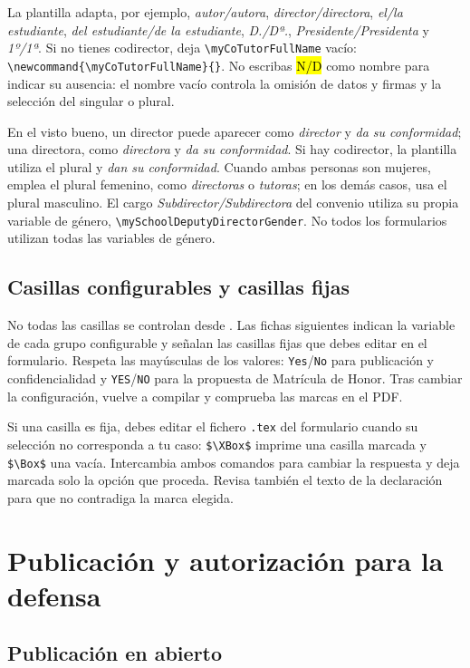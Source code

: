\documentclass[10pt,a4paper]{article}
\newcommand{\variable}[1]{\texttt{\textbackslash{}}\nolinkurl{#1}}
\newcommand{\fichero}[1]{\path{#1}}
\begin{document}
La plantilla adapta, por ejemplo, \emph{autor/autora}, \emph{director/directora}, \emph{el/la estudiante}, \emph{del estudiante/de la estudiante}, \emph{D./Dª.}, \emph{Presidente/Presidenta} y \emph{1º/1ª}. Si no tienes codirector, deja \variable{myCoTutorFullName} vacío: \verb|\newcommand{\myCoTutorFullName}{}|. No escribas \hl{N/D} como nombre para indicar su ausencia: el nombre vacío controla la omisión de datos y firmas y la selección del singular o plural.

En el visto bueno, un director puede aparecer como \emph{director} y \emph{da su conformidad}; una directora, como \emph{directora} y \emph{da su conformidad}. Si hay codirector, la plantilla utiliza el plural y \emph{dan su conformidad}. Cuando ambas personas son mujeres, emplea el plural femenino, como \emph{directoras} o \emph{tutoras}; en los demás casos, usa el plural masculino. El cargo \emph{Subdirector/Subdirectora} del convenio utiliza su propia variable de género, \variable{mySchoolDeputyDirectorGender}. No todos los formularios utilizan todas las variables de género.

\subsection{Casillas configurables y casillas fijas}

No todas las casillas se controlan desde \fichero{Config/myconfig.tex}. Las fichas siguientes indican la variable de cada grupo configurable y señalan las casillas fijas que debes editar en el formulario. Respeta las mayúsculas de los valores: \texttt{Yes}/\texttt{No} para publicación y confidencialidad y \texttt{YES}/\texttt{NO} para la propuesta de Matrícula de Honor. Tras cambiar la configuración, vuelve a compilar y comprueba las marcas en el PDF.

Si una casilla es fija, debes editar el fichero \texttt{.tex} del formulario cuando su selección no corresponda a tu caso: \verb|$\XBox$| imprime una casilla marcada y \verb|$\Box$| una vacía. Intercambia ambos comandos para cambiar la respuesta y deja marcada solo la opción que proceda. Revisa también el texto de la declaración para que no contradiga la marca elegida.

\section{Publicación y autorización para la defensa}

\subsection{Publicación en abierto}\label{form:publicacion}
\end{document}
